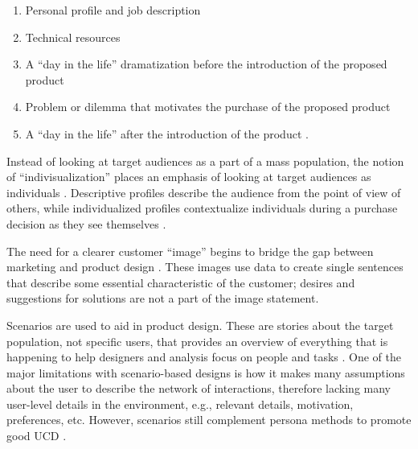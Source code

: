 \documentclass[010-intro.tex]{subfiles}
\begin{document}
        \begin{enumerate}
            \item Personal profile and job description
            \item Technical resources
            \item A ``day in the life'' dramatization before the introduction of the proposed product
            \item Problem or dilemma that motivates the purchase of the proposed product
            \item A ``day in the life'' after the introduction of the product
                \cite{mooreCrossingChasmMarketing1991, pruittPersonaLifecycleKeeping2006}.
        \end{enumerate}

        Instead of looking at target audiences as a part of a mass population,
        the notion of ``indivisualization'' places an emphasis of looking at target audiences as individuals
        \cite{upshawBuildingBrandIdentity1995, pruittPersonaLifecycleKeeping2006}.
        Descriptive profiles describe the audience from the point of view of others,
        while individualized profiles contextualize individuals during a purchase decision as they see themselves
        \cite{upshawBuildingBrandIdentity1995, pruittPersonaLifecycleKeeping2006}.

        The need for a clearer customer ``image'' begins to bridge the gap between marketing and product design
        \cite{melloCustomercentricProductDefinition2003, pruittPersonaLifecycleKeeping2006}.
        These images use data to create single sentences that describe some essential characteristic of the customer;
        desires and suggestions for solutions are not a part of the image statement.

        Scenarios are used to aid in product design.
        These are stories about the target population,
        not specific users,
        that provides an overview of everything that is happening to help designers and analysis focus on people and tasks
        \cite{carrollScenarioBasedDesignEnvisioning1995, pruittPersonaLifecycleKeeping2006}.
        One of the major limitations with scenario-based designs is how it makes many assumptions
        about the user to describe the network of interactions,
        therefore lacking many user-level details in the environment,
        e.g., relevant details, motivation, preferences, etc.
        However, scenarios still complement persona methods to promote good UCD
        \cite{mikkelsonIncorporatingUserArchetypes2000, pruittPersonaLifecycleKeeping2006}.
\end{document}
